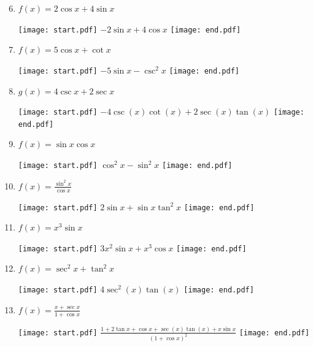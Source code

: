 \documentclass[12pt]{article}
\begin{document}
\begin{enumerate}
\setcounter{enumi}{5}

\item $f(x) = 2\cos{x}+4\sin{x}$ 

\texttt{[image: start.pdf]}
{{$-2\sin{x}+4\cos{x}$}}
\texttt{[image: end.pdf]}


\item $f(x) = 5\cos{x}+\cot{x}$ 

\texttt{[image: start.pdf]}
{{$-5\sin{x}-\csc^2{x}$}}
\texttt{[image: end.pdf]}


\item $g(x) = 4\csc {x} + 2\sec{x}$ 

\texttt{[image: start.pdf]}
{{$-4\csc{(x)}\cot{(x)}+2\sec{(x)}\tan{(x)}$}}
\texttt{[image: end.pdf]}


\item $f(x) = \sin{x}\cos{x}$ 

\texttt{[image: start.pdf]}
{{$\cos^2{x}-\sin^2{x}$}}
\texttt{[image: end.pdf]}


\item $f(x) = \frac{\sin^2{x}}{\cos{x}}$ 

\texttt{[image: start.pdf]}
{{$2\sin{x}+\sin{x}\tan^{2}{x} $}}
\texttt{[image: end.pdf]}


\item $f(x) = x^3\sin{x}$ 

\texttt{[image: start.pdf]}
{{$3x^2\sin{x}+x^3\cos{x}$}}
\texttt{[image: end.pdf]}


\item $f(x) = \sec^2{x}+\tan^2{x}$ 

\texttt{[image: start.pdf]}
{{$4\sec^2{(x)}\tan{(x)}$}}
\texttt{[image: end.pdf]}


\item $f(x) = \frac{x+\sec{x}}{1+\cos{x}}$ 

\texttt{[image: start.pdf]}
{{$\frac{1+2\tan{x}+\cos{x}+\sec{(x)}\tan{(x)}+x\sin{x}}{(1+\cos{x})^2}$ }}
\texttt{[image: end.pdf]}


\end{enumerate}

\end{document}

